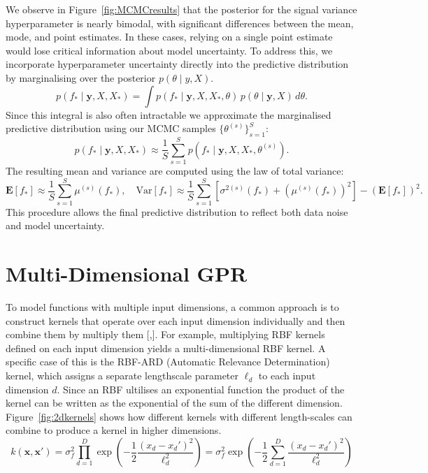 \documentclass{ucdgradtaughtthesis}
\begin{document}
\noindent
We observe in Figure~\ref{fig:MCMCresults} that the posterior for the signal variance hyperparameter is nearly bimodal, with significant differences between the mean, mode, and point estimates. 
In these cases, relying on a single point estimate would lose critical information about model uncertainty.
To address this, we incorporate hyperparameter uncertainty directly into the predictive distribution by marginalising over the posterior \( p(\theta \mid y, X) \).
%
\begin{equation}
p(f_* \mid \mathbf{y}, X, X_*) = \int p(f_* \mid \mathbf{y}, X, X_*, \theta) \, p(\theta \mid \mathbf{y}, X) \, d\theta.
\end{equation}
Since this integral is also often intractable we approximate the marginalised predictive distribution using our MCMC samples \( \{\theta^{(s)}\}_{s=1}^S \):
%
\begin{equation}
p(f_* \mid \mathbf{y}, X, X_*) \approx \frac{1}{S} \sum_{s=1}^{S} p(f_* \mid \mathbf{y}, X, X_*, \theta^{(s)}).
\end{equation}
%
The resulting mean and variance are computed using the law of total variance:
%
\begin{equation}
\mathbf{E}[f_*] \approx \frac{1}{S} \sum_{s=1}^{S} \mu^{(s)}(f_*), \quad
\text{Var}[f_*] \approx \frac{1}{S} \sum_{s=1}^{S} \left[ \sigma^{2(s)}(f_*) + \left(\mu^{(s)}(f_*)\right)^2 \right] - \left( \mathbf{E}[f_*] \right)^2.
\end{equation}
This procedure allows the final predictive distribution to reflect both data noise and model uncertainty.


\section{Multi-Dimensional GPR}
To model functions with multiple input dimensions, a common approach is to construct kernels that operate over each input dimension individually
and then combine them by multiply them [\cite{bible},\cite{gprthesis}]. For example, multiplying RBF kernels defined on each input dimension yields a multi-dimensional RBF kernel.
A specific case of this is the RBF-ARD (Automatic Relevance Determination) kernel, which assigns a separate lengthscale parameter \( \ell_d \) to each input dimension \( d \). Since an RBF ultilises an exponential function
the product of the kernel can be written as the exponential of the sum of the different dimension. Figure~\ref{fig:2dkernels} shows how different kernels with different length-scales can combine to produce a kernel in higher dimensions.
\begin{equation}
    k(\mathbf{x}, \mathbf{x}') 
    = \sigma_f^2 \prod_{d=1}^D \exp\left( -\frac{1}{2} \frac{(x_d - x_d')^2}{\ell_d^2} \right)
    = \sigma_f^2 \exp\left( -\frac{1}{2} \sum_{d=1}^D \frac{(x_d - x_d')^2}{\ell_d^2} \right)
\end{equation}
    
\end{document}
